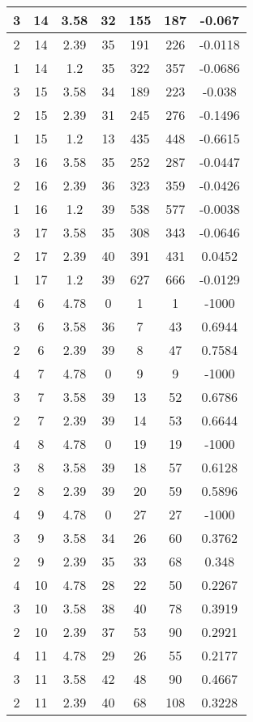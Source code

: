 \documentclass[letterpaper, 12pt]{article}
\begin{document}
\begin{longtable}{|c|c|c|c|c|c|c|}
\hline
3 & 14 & 3.58 & 32 & 155 & 187 & -0.067 \\
\hline
2 & 14 & 2.39 & 35 & 191 & 226 & -0.0118 \\
\hline
1 & 14 & 1.2 & 35 & 322 & 357 & -0.0686 \\
\hline
3 & 15 & 3.58 & 34 & 189 & 223 & -0.038 \\
\hline
2 & 15 & 2.39 & 31 & 245 & 276 & -0.1496 \\
\hline
1 & 15 & 1.2 & 13 & 435 & 448 & -0.6615 \\
\hline
3 & 16 & 3.58 & 35 & 252 & 287 & -0.0447 \\
\hline
2 & 16 & 2.39 & 36 & 323 & 359 & -0.0426 \\
\hline
1 & 16 & 1.2 & 39 & 538 & 577 & -0.0038 \\
\hline
3 & 17 & 3.58 & 35 & 308 & 343 & -0.0646 \\
\hline
2 & 17 & 2.39 & 40 & 391 & 431 & 0.0452 \\
\hline
1 & 17 & 1.2 & 39 & 627 & 666 & -0.0129 \\
\hline
4 & 6 & 4.78 & 0 & 1 & 1 & -1000 \\
\hline
3 & 6 & 3.58 & 36 & 7 & 43 & 0.6944 \\
\hline
2 & 6 & 2.39 & 39 & 8 & 47 & 0.7584 \\
\hline
4 & 7 & 4.78 & 0 & 9 & 9 & -1000 \\
\hline
3 & 7 & 3.58 & 39 & 13 & 52 & 0.6786 \\
\hline
2 & 7 & 2.39 & 39 & 14 & 53 & 0.6644 \\
\hline
4 & 8 & 4.78 & 0 & 19 & 19 & -1000 \\
\hline
3 & 8 & 3.58 & 39 & 18 & 57 & 0.6128 \\
\hline
2 & 8 & 2.39 & 39 & 20 & 59 & 0.5896 \\
\hline
4 & 9 & 4.78 & 0 & 27 & 27 & -1000 \\
\hline
3 & 9 & 3.58 & 34 & 26 & 60 & 0.3762 \\
\hline
2 & 9 & 2.39 & 35 & 33 & 68 & 0.348 \\
\hline
4 & 10 & 4.78 & 28 & 22 & 50 & 0.2267 \\
\hline
3 & 10 & 3.58 & 38 & 40 & 78 & 0.3919 \\
\hline
2 & 10 & 2.39 & 37 & 53 & 90 & 0.2921 \\
\hline
4 & 11 & 4.78 & 29 & 26 & 55 & 0.2177 \\
\hline
3 & 11 & 3.58 & 42 & 48 & 90 & 0.4667 \\
\hline
2 & 11 & 2.39 & 40 & 68 & 108 & 0.3228 \\

\end{longtable}
\end{document}
